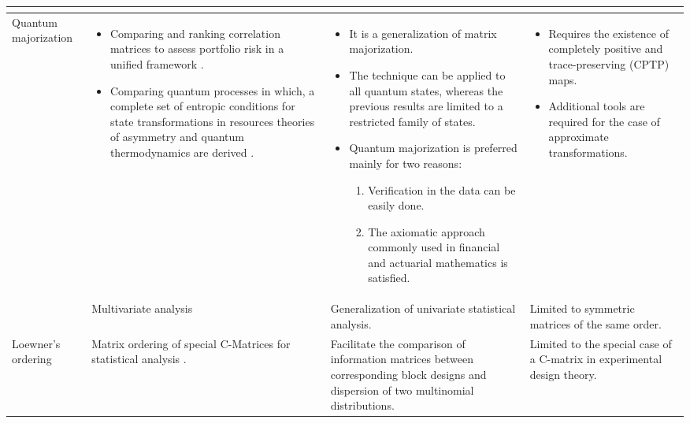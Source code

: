 \documentclass[journal,article,submit,moreauthors,pdftex]{Definitions/mdpi}
\begin{document}
\begin{paracol}{1}
\begin{longtable}{p{2cm}L{3.9cm}L{3.9cm}L{3.9cm}}
\begin{itemize}[leftmargin=*]
        \end{itemize} \\ \hline
        Quantum majorization & \begin{itemize}[leftmargin=*]
            \item Comparing and ranking correlation matrices to assess portfolio risk in a unified framework \cite{Fontanari2019a}.
            \item Comparing quantum processes in which, a complete set of entropic conditions for state transformations in resources theories of asymmetry and quantum thermodynamics are derived \cite{Gour2018}. 
        \end{itemize} & \begin{itemize}[leftmargin=*]
            \item It is a generalization of matrix majorization.
            \item The technique can be applied to all quantum states, whereas the previous results are limited to a restricted family of states.
            \item Quantum majorization is preferred mainly for two reasons:
            \begin{enumerate}[leftmargin=*,label=(\roman*)]
                \item Verification in the data can be easily done.
                \item The axiomatic approach commonly used in financial and actuarial mathematics is satisfied.
            \end{enumerate}
        \end{itemize} & \begin{itemize}[leftmargin=*]
            \item Requires the existence of completely positive and trace-preserving (CPTP) maps.
            \item Additional tools are required for the case of approximate transformations.
        \end{itemize}   \\
        \hline
        & Multivariate analysis \cite{Siotani1967} & Generalization of univariate statistical analysis. & 
        Limited to symmetric matrices of the same order. \\
        Loewner's ordering & Matrix ordering of special C-Matrices for statistical analysis \cite{Baksalary1985}. & Facilitate the comparison of information matrices between corresponding block designs and dispersion of two multinomial distributions. & Limited to the special case of a C-matrix in experimental design theory. \\

\end{longtable}
\end{paracol}
\end{document}
